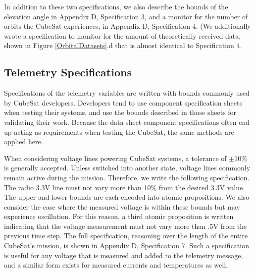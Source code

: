 \documentclass[conf]{new-aiaa}
\begin{document}
In addition to these two specifications, we also describe the bounds of the elevation angle in Appendix D, Specification 3, and a monitor for the number of orbits the CubeSat experiences, in Appendix D, Specification 4. (We additionally wrote a specification to monitor for the amount of theoretically received data, shown in Figure \ref{OrbitalDatasets}.d that is almost identical to Specification 4.

\subsection{Telemetry Specifications}

Specifications of the telemetry variables are written with bounds commonly used by CubeSat developers. Developers tend to use component specification sheets when testing their systems, and use the bounds described in those sheets for validating their work. Because the data sheet component specifications often end up acting as requirements when testing the CubeSat, the same methods are applied here.%

When considering voltage lines powering CubeSat systems, a tolerance of $\pm$10$\%$ is generally accepted. Unless switched into another state, voltage lines commonly remain active during the mission. Therefore, we write the following specification. The radio 3.3V line must not vary more than 10$\%$ from the desired 3.3V value. The upper and lower bounds are each encoded into atomic propositions. We also consider the case where the measured voltage is within these bounds but may experience oscillation. For this reason, a third atomic proposition is written indicating that the voltage measurement must not vary more than .5V from the previous time step. The full specification, reasoning over the length of the entire CubeSat's mission, is shown in Appendix D, Specification 7. Such a specification is useful for any voltage that is measured and added to the telemetry message, and a similar form exists for measured currents and temperatures as well.
\end{document}
